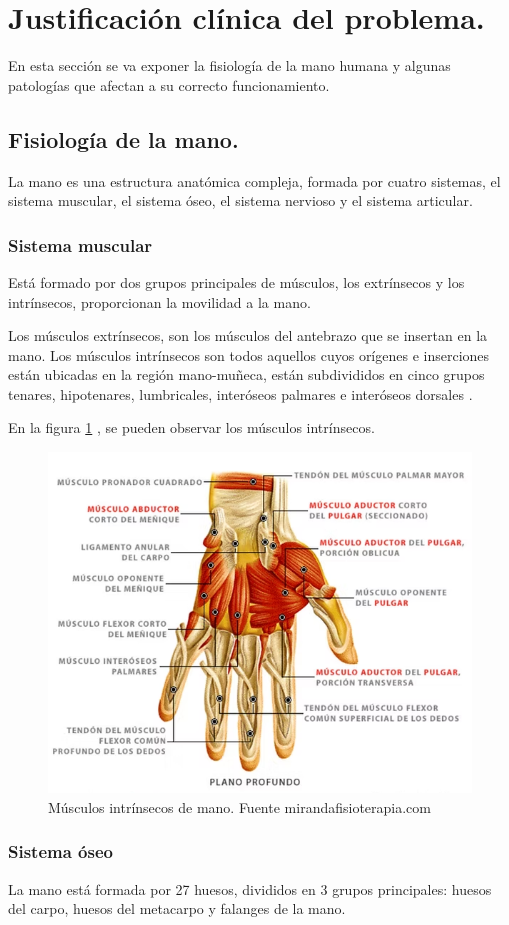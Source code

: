 \section{Justificación clínica del problema.}

En esta sección se va exponer la fisiología de la mano humana y algunas patologías que afectan a su correcto funcionamiento.
\subsection{Fisiología de la mano.}

La mano es una estructura anatómica compleja, formada por cuatro sistemas, el sistema muscular, el sistema óseo, el sistema nervioso y el sistema articular. 

\subsubsection{Sistema muscular}

Está formado por dos grupos principales de músculos, los extrínsecos y los intrínsecos, proporcionan la movilidad a la mano. 

Los músculos extrínsecos, son los músculos del antebrazo que se insertan en la mano. Los músculos intrínsecos son todos aquellos cuyos orígenes e inserciones están ubicadas en la región mano-muñeca, están subdivididos en cinco grupos tenares, hipotenares, lumbricales, interóseos palmares e interóseos dorsales .\cite{mano_anatomía}

En la figura \ref{fig:Músculos_mano} , se pueden observar los músculos intrínsecos.
\begin{figure}
    \centering
    \includegraphics[width=0.5\linewidth]{img/Musculos_mano.png}
    \caption{Músculos intrínsecos de mano. Fuente mirandafisioterapia.com}
    \label{fig:Músculos_mano}
\end{figure}


\subsubsection{Sistema óseo}
La mano está formada por 27 huesos, divididos en 3 grupos principales: huesos del carpo, huesos del metacarpo y falanges de la mano.

